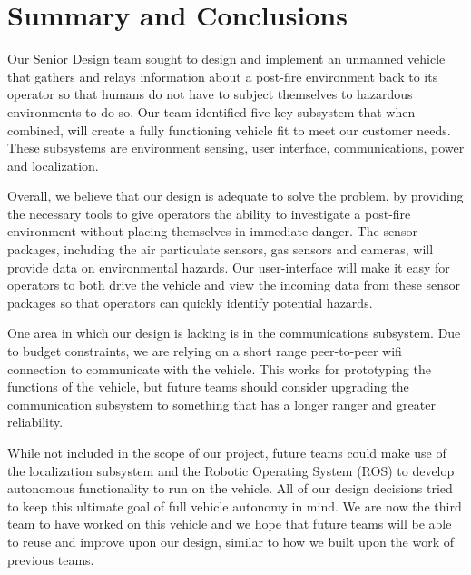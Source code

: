 \chapter{Summary and Conclusions}

Our Senior Design team sought to design and implement an unmanned vehicle that gathers and relays information about a post-fire environment back to its operator so that humans do not have to subject themselves to hazardous environments to do so. Our team identified five key subsystem that when combined, will create a fully functioning vehicle fit to meet our customer needs.  These subsystems are environment sensing, user interface, communications, power and localization.

Overall, we believe that our design is adequate to solve the problem, by providing the necessary tools to give operators the ability to investigate a post-fire environment without placing themselves in immediate danger.  The sensor packages, including the air particulate sensors, gas sensors and cameras, will provide data on environmental hazards.  Our user-interface will make it easy for operators to both drive the vehicle and view the incoming data from these sensor packages so that operators can quickly identify potential hazards.

One area in which our design is lacking is in the communications subsystem.  Due to budget constraints, we are relying on a short range peer-to-peer wifi connection to communicate with the vehicle.  This works for prototyping the functions of the vehicle, but future teams should consider upgrading the communication subsystem to something that has a longer ranger and greater reliability.  

While not included in the scope of our project, future teams could make use of the localization subsystem and the Robotic Operating System (ROS) to develop autonomous functionality to run on the vehicle. All of our design decisions tried to keep this ultimate goal of full vehicle autonomy in mind. We are now the third team to have worked on this vehicle and we hope that future teams will be able to reuse and improve upon our design, similar to how we built upon the work of previous teams.


